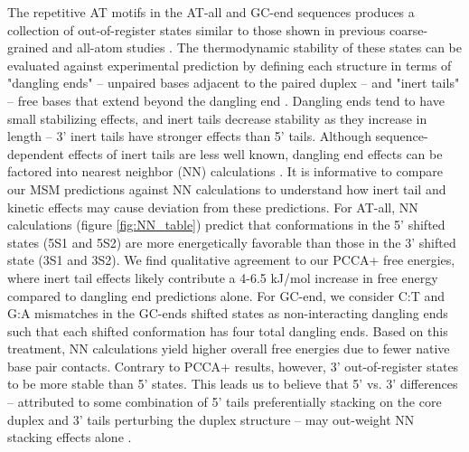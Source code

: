 \documentclass[journal=jpcbfk,manuscript=article]{achemso}
\begin{document}
The repetitive AT motifs in the AT-all and GC-end sequences produces a collection of out-of-register states similar to those shown in previous coarse-grained and all-atom studies \citep{Phys2014,  Romano2013DNADependence, Araque2016LatticeCooperativity, Xiao2019}. The thermodynamic stability of these states can be evaluated against experimental prediction by defining each structure in terms of "dangling ends" -- unpaired bases adjacent to the paired duplex -- and "inert tails" -- free bases that extend beyond the dangling end \citep{Michele2014EHybridization}. Dangling ends tend to have small stabilizing effects, and inert tails decrease stability as they increase in length -- 3' inert tails have stronger effects than 5' tails. Although sequence-dependent effects of inert tails are less well known, dangling end effects can be factored into nearest neighbor (NN) calculations \citep{Santalucia2004TM}. It is informative to compare our MSM predictions against NN calculations to understand how inert tail and kinetic effects may cause deviation from these predictions. For AT-all, NN calculations (figure \ref{fig:NN_table}) predict that conformations in the 5' shifted states (5S1 and 5S2) are more energetically favorable than those in the 3' shifted state (3S1 and 3S2). We find qualitative agreement to our PCCA+ free energies, where inert tail effects likely contribute a 4-6.5 kJ/mol increase in free energy compared to dangling end predictions alone. For GC-end, we consider C:T and G:A mismatches in the GC-ends shifted states as non-interacting dangling ends such that each shifted conformation has four total dangling ends. Based on this treatment, NN calculations yield higher overall free energies due to fewer native base pair contacts.  Contrary to PCCA+ results, however, 3' out-of-register states to be more stable than 5' states. This leads us to believe that 5' vs. 3' differences -- attributed to some combination of 5' tails preferentially stacking on the core duplex and 3' tails perturbing the duplex structure -- may out-weight NN stacking effects alone \citep{Doktycz1990ThermodynamicATGC}. 

\end{document}
